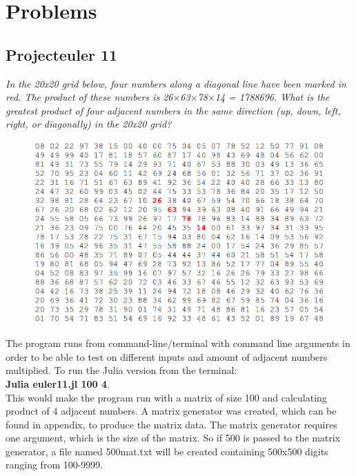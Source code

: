 \documentclass[a4paper, 11pt, titlepage]{article}
\begin{document}
\section{Problems}
\subsection{Projecteuler 11}

\textit{In the 20x20 grid below, four numbers along a diagonal line have been marked in red. The product of these numbers is 26$\times$63$\times$78$\times$14 = 1788696. What is the greatest product of four adjacent numbers in the same direction (up, down, left, right, or diagonally) in the 20x20 grid?}
\begin{figure}[H]
	\begin{center}
	\includegraphics[scale=0.30]{image/11.jpg}
	\label{11}
	\end{center}
\end{figure}
The program runs from command-line/terminal with command line arguments in order to be able to test on different inputs and amount of adjacent numbers multiplied. To run the Julia version from the terminal: \\
\textbf{Julia euler11.jl 100 4}. \\
This would make the program run with a matrix of size 100 and calculating product of 4 adjacent numbers. A matrix generator was created, which can be found in appendix, to produce the matrix data. The matrix generator requires one argument, which is the size of the matrix. So if 500 is passed to the matrix generator, a file named 500mat.txt will be created containing 500x500 digits ranging from 100-9999.
\end{document}
